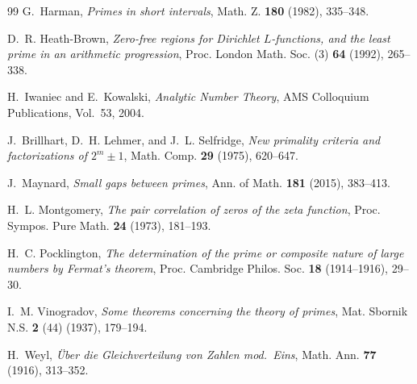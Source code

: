 \documentclass[11pt,a4paper]{article}
\theoremstyle{definition}
\theoremstyle{remark}
\begin{document}
\begin{thebibliography}{99}
G.~Harman, \emph{Primes in short intervals}, Math. Z. \textbf{180}
(1982), 335--348.

D.~R. Heath-Brown, \emph{Zero-free regions for Dirichlet
$L$-functions, and the least prime in an arithmetic progression},
Proc. London Math. Soc. (3) \textbf{64} (1992), 265--338.

H.~Iwaniec and E.~Kowalski, \emph{Analytic Number Theory},
AMS Colloquium Publications, Vol.~53, 2004.

J.~Brillhart, D.~H. Lehmer, and J.~L. Selfridge, \emph{New primality
criteria and factorizations of $2^{m}\pm 1$}, Math. Comp.
\textbf{29} (1975), 620--647.

J.~Maynard, \emph{Small gaps between primes}, Ann. of Math.
\textbf{181} (2015), 383--413.

H.~L. Montgomery, \emph{The pair correlation of zeros of the zeta
function}, Proc. Sympos. Pure Math. \textbf{24} (1973), 181--193.

H.~C. Pocklington, \emph{The determination of the prime or composite
nature of large numbers by Fermat's theorem}, Proc. Cambridge
Philos. Soc. \textbf{18} (1914--1916), 29--30.

I.~M. Vinogradov, \emph{Some theorems concerning the theory of
primes}, Mat. Sbornik N.S. \textbf{2} (44) (1937), 179--194.

H.~Weyl, \emph{\"Uber die Gleichverteilung von Zahlen mod.\ Eins},
Math. Ann. \textbf{77} (1916), 313--352.

\end{thebibliography}
\end{document}
